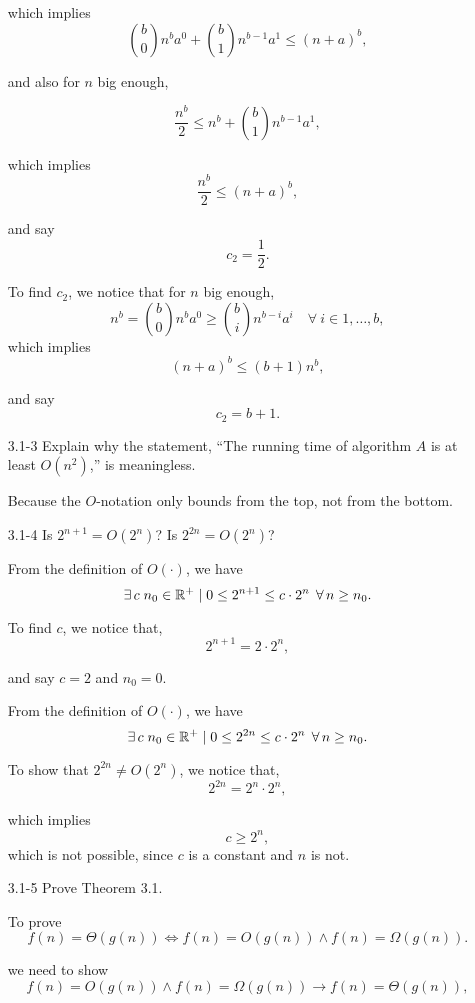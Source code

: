 \begin{enumerate}
\begin{framed}
which implies
\[
\binom{b}{0} n^b a^0 + \binom{b}{1} n^{b - 1} a^1 \le (n + a)^b,
\]

and also for $n$ big enough,

\[
\frac{n^b}{2} \le n^b + \binom{b}{1} n^{b - 1} a^1,
\]

which implies
\[
\frac{n^b}{2} \le (n + a)^b,
\]

and say
\[
c_2 = \frac{1}{2}.
\]

To find \(c_2\), we notice that for $n$ big enough,
\[
n^b = \binom{b}{0} n^b a^0
\geq \binom{b}{i} n^{b - i} a^i \quad \forall\ i \in 1, \dots ,b,
\]
which implies
\[
(n + a)^b \leq (b + 1) n^b,
\]

and say
\[
c_2 = b + 1.
\]
\end{framed}

\item[3.1{-}3]{Explain why the statement, ``The running time of algorithm $A$ is
  at least $O(n^2)$,'' is meaningless.}

\begin{framed}
Because the $O$-notation only bounds from the top, not from the bottom.
\end{framed}

\item[3.1{-}4]{Is $2^{n+1} = O(2^n)$? Is $2^{2n} = O(2^n)$?}

\begin{framed}
From the definition of $O(\cdot)$, we have
\[
\operatorname{\exists} c\;n_0\in\mathbb{R}^+ \mid 0 \leq 2^{n+1} \leq c \cdot 2^n\;
\operatorname{\forall} n \ge n_0.
\]

To find $c$, we notice that,
\[
2^{n+1} = 2 \cdot 2^n,
\]

and say $c = 2$ and $n_0 = 0$.

From the definition of $O(\cdot)$, we have
\[
\operatorname{\exists} c\;n_0\in\mathbb{R}^+ \mid 0 \leq 2^{2n} \leq c \cdot 2^n\;
\operatorname{\forall} n \ge n_0.
\]

To show that $2^{2n} \neq O(2^n)$, we notice that,
\[
2^{2n} = 2^n \cdot 2^n,
\]

which implies
\[
c \ge 2^n,
\]
which is not possible, since $c$ is a constant and $n$ is not.
\end{framed}

\item[3.1{-}5]{Prove Theorem 3.1.}

\begin{framed}
To prove
\[
f(n) = \Theta(g(n)) \iff f(n) = O(g(n)) \wedge f(n) = \Omega(g(n)).
\]

we need to show
\[
f(n) = O(g(n)) \wedge f(n) = \Omega(g(n)) \rightarrow f(n) = \Theta(g(n)),
\]


\end{framed}
\end{enumerate}

